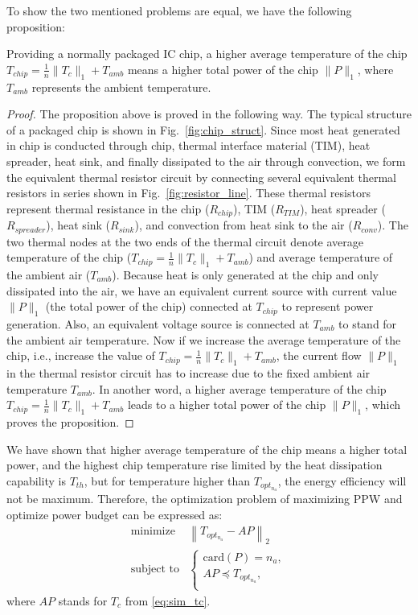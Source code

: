 To show the two mentioned problems are equal, we have the following
proposition: 
\begin{proposition}
Providing a normally packaged IC chip, a higher average temperature of
the chip $T_{chip} = \frac{1}{n}\|T_c\|_1 + T_{amb}$ means a higher total power of the
chip $\|P\|_1$, where $T_{amb}$ represents the ambient temperature.
\end{proposition}
\begin{proof}
The proposition above is proved in the following way. The typical structure
of a packaged chip is shown in Fig.~\ref{fig:chip_struct}. Since most heat generated in chip is
conducted through chip, thermal interface material (TIM), heat spreader,
heat sink, and finally dissipated to the air through convection, we
form the equivalent thermal resistor circuit by connecting several
equivalent thermal resistors in series shown in Fig.~\ref{fig:resistor_line}. These thermal resistors represent thermal
resistance in the chip ($R_{chip}$), TIM ($R_{TIM}$), heat spreader
($R_{spreader}$), heat sink ($R_{sink}$), and convection from heat
sink to the air ($R_{conv}$). The two thermal nodes at the two ends of
the thermal circuit denote average temperature of the chip
($T_{chip}=\frac{1}{n}\|T_c\|_1 + T_{amb}$) and average temperature of the
ambient air ($T_{amb}$). 
Because heat is only generated at the chip and only
dissipated into the air, we have an equivalent current source with
current value $\|P\|_1$ (the total power of the chip) connected
at $T_{chip}$ to represent power generation. Also, an equivalent voltage
source is connected at $T_{amb}$ to stand for the ambient air
temperature. Now if we increase the average temperature of the chip,
i.e., increase the value of $T_{chip}=\frac{1}{n}\|T_c\|_1+T_{amb}$, the current flow $\|P\|_1$ in the thermal
resistor circuit has to increase due to the fixed ambient air temperature
$T_{amb}$. In another word, a higher average temperature of
the chip $T_{chip} = \frac{1}{n}\|T_c\|_1 + T_{amb}$ leads to a higher total power of the
chip $\|P\|_1$, which proves the proposition.
\end{proof}

We have shown that higher average temperature of the chip means a higher
total power, and the highest
chip temperature rise limited by the heat dissipation capability is
$T_{th}$, but for temperature higher than $T_{opt_{n_{a}}}$, the energy efficiency will not be maximum. Therefore, the optimization problem of maximizing PPW and optimize power budget can be expressed as:
\begin{equation}\label{eq:sim_opt_topt}
\begin{split}
\text{minimize } &  \left \| T_{opt_{n_{a}}} - AP \right \|_{2}\\
\text{subject to} &\left\{
\begin{array}{lr}
\text{card}(P) = n_{a},\\
AP \preceq T_{opt_{n_{a}}},\\
\end{array}
\right.
\end{split}
\end{equation}
where $AP$ stands for $T_{c}$ from \eqref{eq:sim_tc}.



